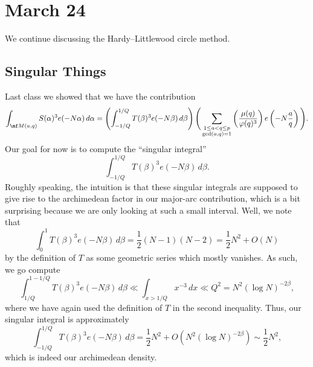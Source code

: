 \documentclass[../notes.tex]{subfiles}
\begin{document}
\section{March 24}
We continue discussing the Hardy--Littlewood circle method.

\subsection{Singular Things}
Last class we showed that we have the contribution
\[\int_{\mf M(a,q)}S(\alpha)^3e(-N\alpha)\,d\alpha=\left(\int_{-1/Q}^{1/Q}T(\beta)^3e(-N\beta)\,d\beta\right)\Bigg(\sum_{\substack{1\le a<q\le p\\\gcd(a,q)=1}}\left(\frac{\mu(q)}{\varphi(q)^3}\right)e\left(-N\frac aq\right)\Bigg).\]
Our goal for now is to compute the ``singular integral''
\[\int_{-1/Q}^{1/Q}T(\beta)^3e(-N\beta)\,d\beta.\]
Roughly speaking, the intuition is that these singular integrals are supposed to give rise to the archimedean factor in our major-arc contribution, which is a bit surprising because we are only looking at such a small interval. Well, we note that
\[\int_0^1T(\beta)^3e(-N\beta)\,d\beta=\frac12(N-1)(N-2)=\frac12N^2+O(N)\]
by the definition of $T$ as some geometric series which mostly vanishes. As such, we go compute
\[\int_{1/Q}^{1-1/Q}T(\beta)^3e(-N\beta)\,d\beta\ll\int_{x>1/Q}x^{-3}\,dx\ll Q^2=N^2(\log N)^{-2\beta},\]
where we have again used the definition of $T$ in the second inequality. Thus, our singular integral is approximately
\[\int_{-1/Q}^{1/Q}T(\beta)^3e(-N\beta)\,d\beta=\frac12N^2+O\left(N^2(\log N)^{-2\beta}\right)\sim\frac12N^2,\]
which is indeed our archimedean density.
\end{document}
